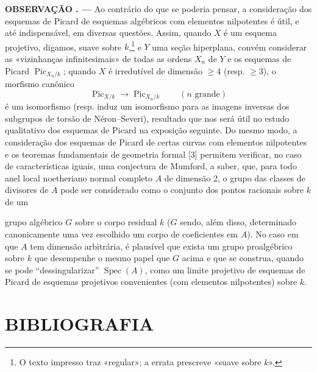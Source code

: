 \documentclass[11pt,twoside,openany]{book}
\numberwithin{equation}{section}
\newcommand{\src}[1]{%
  \phantomsection\hypertarget{src:#1}{}%
  \marginpar{\raggedleft\footnotesize\sffamily #1}%
}
\theoremstyle{plain}
\theoremstyle{definition}
\theoremstyle{remark}
\newcommand{\result}[2]{%
  \par\medskip\noindent\textbf{#1%
  \if\relax\detokenize{#2}\relax\else\space#2\fi. ---}\enspace
}
\newcommand{\FgaUnitKey}{frontmatter}
\renewcommand{\src}[1]{%
  \phantomsection\hypertarget{src:\FgaUnitKey:#1}{}%
  \marginpar{\raggedleft\footnotesize\sffamily #1}%
}
\begin{document}
\result{OBSERVAÇÃO}{6.8} Ao contrário do que se poderia pensar, a consideração
dos esquemas de Picard de esquemas algébricos com elementos nilpotentes é útil,
e até indispensável, em diversas questões. Assim, quando $X$ é um esquema
projetivo, digamos, suave sobre $k$,\footnote{O texto impresso traz «regular»;
a errata prescreve «suave sobre $k$».} e $Y$ uma seção hiperplana, convém
considerar as «vizinhanças infinitesimais» de todas as ordens $X_n$ de $Y$ e os
esquemas de Picard $\operatorname{Pic}_{X_n/k}$; quando $X$ é irredutível de
dimensão $\geq4$ (resp. $\geq3$), o morfismo canônico
\[
\operatorname{Pic}_{X/k}\longrightarrow\operatorname{Pic}_{X_n/k}
\qquad(n\text{ grande})
\]
é um isomorfismo (resp. induz um isomorfismo para as imagens inversas dos
subgrupos de torsão de Néron--Severi), resultado que nos será útil no estudo
qualitativo dos esquemas de Picard na exposição seguinte. Do mesmo modo, a
consideração dos esquemas de Picard de certas curvas com elementos nilpotentes
e os teoremas fundamentais de geometria formal [3] permitem verificar, no caso
de características iguais, uma conjectura de Mumford, a saber, que, para todo
anel local noetheriano normal completo $A$ de dimensão 2, o grupo das classes
de divisores de $A$ pode ser considerado como o conjunto dos pontos racionais
sobre $k$ de um
\src{161}
grupo algébrico $G$ sobre o corpo residual $k$ ($G$ sendo, além disso,
determinado canonicamente uma vez escolhido um corpo de coeficientes em $A$).
No caso em que $A$ tem dimensão arbitrária, é plausível que exista um grupo
proalgébrico sobre $k$ que desempenhe o mesmo papel que $G$ acima e que se
construa, quando se pode ``dessingularizar'' $\operatorname{Spec}(A)$, como um
limite projetivo de esquemas de Picard de esquemas projetivos convenientes (com
elementos nilpotentes) sobre $k$.

\section*{BIBLIOGRAFIA}
\end{document}
